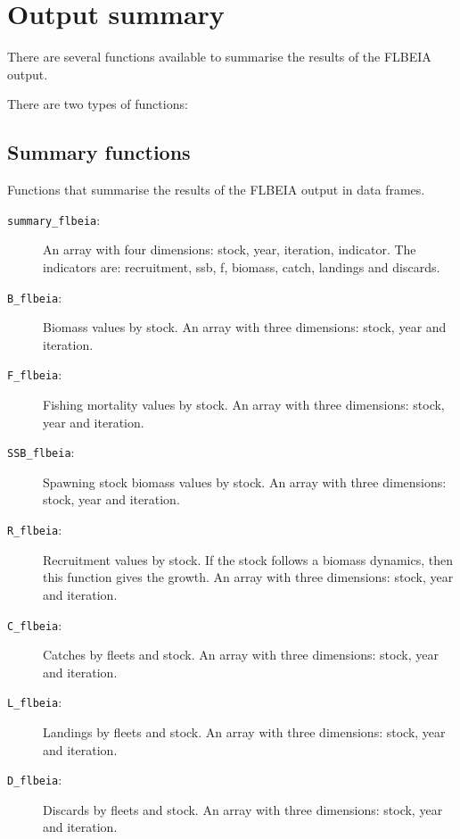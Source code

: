
\section{Output summary} \label{sec:FLBEIAoutput}

  There are several functions available to summarise the results of the FLBEIA output.
  
  There are two types of functions: 
  
\subsection{Summary functions}

  Functions that summarise the results of the FLBEIA output in data frames.
  
  \begin{description}

    \item[\texttt{summary\_flbeia}:] An array with four dimensions: stock, year, iteration, indicator. 
      The indicators are: recruitment, ssb, f, biomass, catch, landings and discards.

    \item[\texttt{B\_flbeia}:] Biomass values by stock. 
      An array with three dimensions: stock, year and iteration.
    \item[\texttt{F\_flbeia}:] Fishing mortality values by stock. 
      An array with three dimensions: stock, year and iteration.
    \item[\texttt{SSB\_flbeia}:] Spawning stock biomass values by stock. 
      An array with three dimensions: stock, year and iteration.
    \item[\texttt{R\_flbeia}:] Recruitment values by stock. 
      If the stock follows a biomass dynamics, then this function gives the growth. 
      An array with three dimensions: stock, year and iteration.
    
    \item[\texttt{C\_flbeia}:] Catches by fleets and stock. 
      An array with three dimensions: stock, year and iteration.
    \item[\texttt{L\_flbeia}:] Landings by fleets and stock. 
      An array with three dimensions: stock, year and iteration.
    \item[\texttt{D\_flbeia}:] Discards by fleets and stock. 
      An array with three dimensions: stock, year and iteration.


\end{description}
